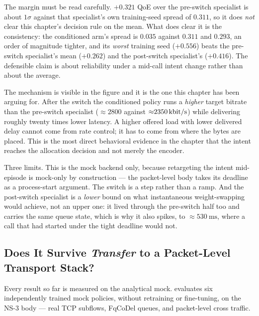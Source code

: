 The margin must be read carefully. $+0.321$ QoE over the pre-switch specialist is about $1\sigma$ against
that specialist's own training-seed spread of $0.311$, so it does \emph{not} clear this chapter's
decision rule on the mean. What does clear it is the consistency: the conditioned arm's spread is
$0.035$ against $0.311$ and $0.293$, an order of magnitude tighter, and its \emph{worst} training seed
($+0.556$) beats the pre-switch specialist's mean ($+0.262$) and the post-switch specialist's ($+0.416$).
The defensible claim is about reliability under a mid-call intent change rather than about the average.

The mechanism is visible in the figure and it is the one this chapter has been arguing for. After the
switch the conditioned policy runs a \emph{higher} target bitrate than the pre-switch specialist
(${\approx}2800$ against ${\approx}\SI{2350}{\kilo\bit\per\second}$) while delivering roughly twenty
times lower latency. A higher offered load with lower delivered delay cannot come from rate control; it
has to come from where the bytes are placed. This is the most direct behavioral evidence in the chapter
that the intent reaches the allocation decision and not merely the encoder.

Three limits. This is the mock backend only, because retargeting the intent mid-episode is mock-only by
construction --- the packet-level body takes its deadline as a process-start argument. The switch is a
step rather than a ramp. And the post-switch specialist is a \emph{lower} bound on what instantaneous
weight-swapping would achieve, not an upper one: it lived through the pre-switch half too and carries
the same queue state, which is why it also spikes, to ${\approx}\SI{530}{\milli\second}$, where a call
that had started under the tight deadline would not.

\subsection[Does It Survive Transfer to a Packet-Level Transport Stack?]{Does It Survive
\emph{Transfer} to a Packet-Level Transport Stack?}
\label{sec:p2eval:ns3}

Every result so far is measured on the analytical mock.  evaluates six independently
trained mock policies, without retraining or fine-tuning, on the NS-3 body --- real TCP subflows,
FqCoDel queues, and packet-level cross traffic.


